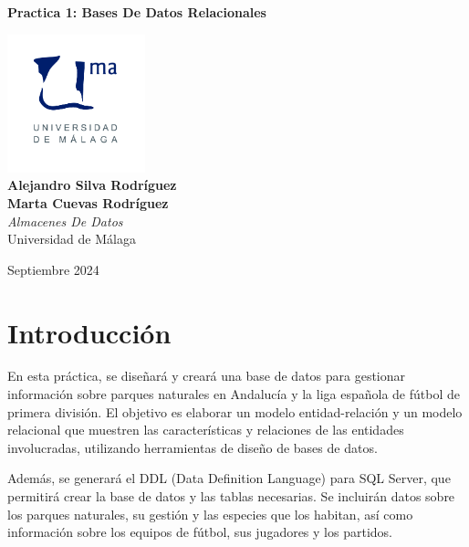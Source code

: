 \documentclass{article}
\begin{document}
\begin{titlepage}
	\centering
	\vspace*{3cm}
	
	{\Huge \textbf{Practica 1: Bases De Datos Relacionales}\\[0.5cm]}
	
	\vspace{2cm}
	\includegraphics[width=0.3\textwidth]{images/uma_logo.jpg}\\[1cm]
	
	{\LARGE \textbf{Alejandro Silva Rodríguez}\\[0.5cm]}
	{\LARGE \textbf{Marta Cuevas Rodríguez}\\[0.5cm]}
	{\large \textit{Almacenes De Datos}\\
		Universidad de Málaga\\
		}
	
	\vfill
	
	{\large Septiembre 2024}
\end{titlepage}

\tableofcontents

\newpage

\section{Introducción}

En esta práctica, se diseñará y creará una base de datos para gestionar información sobre parques naturales en Andalucía y la liga española de fútbol de primera división. El objetivo es elaborar un modelo entidad-relación y un modelo relacional que muestren las características y relaciones de las entidades involucradas, utilizando herramientas de diseño de bases de datos.

Además, se generará el DDL (Data Definition Language) para SQL Server, que permitirá crear la base de datos y las tablas necesarias. Se incluirán datos sobre los parques naturales, su gestión y las especies que los habitan, así como información sobre los equipos de fútbol, sus jugadores y los partidos.
\end{document}
